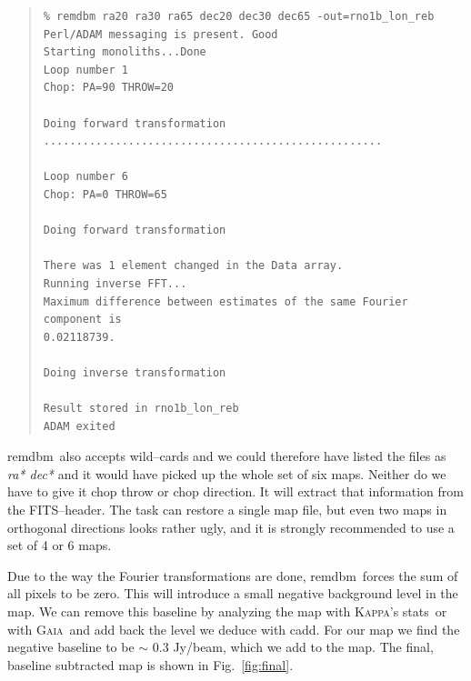 \documentclass[twoside,11pt]{article}
\newenvironment{myquote}{\begin{quote}\begin{small}}{\end{small}\end{quote}}
\newcommand{\Kappa}{\xref{\textsc{Kappa}}{sun95}{}}
\newcommand{\gaia}{\xref{\textsc{Gaia}}{sun214}{}}
\newcommand{\task}[1]{\textsf{#1}}
\newcommand{\remdbm}{\xref{\task{remdbm}}{sun216}{REMDBM}}
\newcommand{\stats}{\xref{\task{stats}}{sun95}{STATS}}
\newcommand{\cadd}{\xref{\task{cadd}}{sun95}{CADD}}
\newcommand{\xref}[3]{#1}
\renewcommand{\_}{\texttt{\symbol{95}}}
\begin{document}
\begin{myquote}
\begin{verbatim}
% remdbm ra20 ra30 ra65 dec20 dec30 dec65 -out=rno1b_lon_reb
Perl/ADAM messaging is present. Good
Starting monoliths...Done
Loop number 1
Chop: PA=90 THROW=20

Doing forward transformation
....................................................

Loop number 6
Chop: PA=0 THROW=65

Doing forward transformation

There was 1 element changed in the Data array.
Running inverse FFT...
Maximum difference between estimates of the same Fourier component is
0.02118739.

Doing inverse transformation

Result stored in rno1b_lon_reb
ADAM exited

\end{verbatim}
\end{myquote}

\remdbm\ also accepts wild--cards and we could therefore have listed
the files as {\it ra* dec*} and it would have picked up the whole set
of six maps.  Neither do we have to give it chop throw or chop
direction.  It will extract that information from the FITS--header.
The task can restore a single map file, but even two maps in
orthogonal directions looks rather ugly, and it is strongly
recommended to use a set of 4 or 6 maps.


Due to the way the Fourier transformations are done, \remdbm\ forces
the sum of all pixels to be zero.  This will introduce a small
negative background level in the map.  We can remove this baseline by
analyzing the map with \Kappa's \stats\ or with \gaia\ and add back
the level we deduce with \cadd.  For our map we find the negative
baseline to be $\sim$ 0.3 Jy/beam, which we add to the map.  The
final, baseline subtracted map is shown in Fig.\ \ref{fig:final}.
\end{document}

